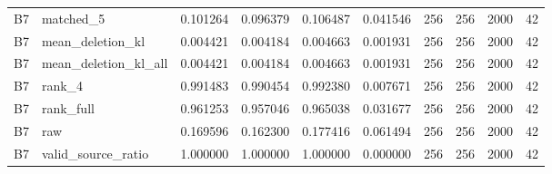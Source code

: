 \begin{tabular}{llrrrrrrrr}
B7 & matched_5 & 0.101264 & 0.096379 & 0.106487 & 0.041546 & 256 & 256 & 2000 & 42 \\
B7 & mean_deletion_kl & 0.004421 & 0.004184 & 0.004663 & 0.001931 & 256 & 256 & 2000 & 42 \\
B7 & mean_deletion_kl_all & 0.004421 & 0.004184 & 0.004663 & 0.001931 & 256 & 256 & 2000 & 42 \\
B7 & rank_4 & 0.991483 & 0.990454 & 0.992380 & 0.007671 & 256 & 256 & 2000 & 42 \\
B7 & rank_full & 0.961253 & 0.957046 & 0.965038 & 0.031677 & 256 & 256 & 2000 & 42 \\
B7 & raw & 0.169596 & 0.162300 & 0.177416 & 0.061494 & 256 & 256 & 2000 & 42 \\
B7 & valid_source_ratio & 1.000000 & 1.000000 & 1.000000 & 0.000000 & 256 & 256 & 2000 & 42 \\
\bottomrule
\end{tabular}
